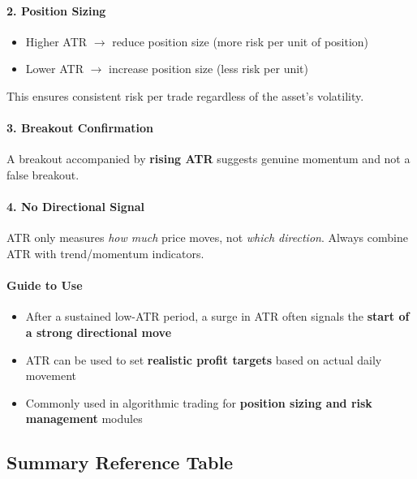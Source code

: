 \documentclass[12pt,openany]{book}
\begin{document}
\paragraph{2. Position Sizing}
\begin{itemize}[leftmargin=*]
    \item Higher ATR \(\rightarrow\) reduce position size (more risk per unit of position)
    \item Lower ATR \(\rightarrow\) increase position size (less risk per unit)
\end{itemize}

This ensures consistent risk per trade regardless of the asset's volatility.

\paragraph{3. Breakout Confirmation}
A breakout accompanied by \textbf{rising ATR} suggests genuine momentum and not a false breakout.

\paragraph{4. No Directional Signal}
ATR only measures \emph{how much} price moves, not \emph{which direction}. Always combine ATR with trend/momentum indicators.

\paragraph{Guide to Use}
\begin{itemize}[leftmargin=*]
    \item After a sustained low-ATR period, a surge in ATR often signals the \textbf{start of a strong directional move}
    \item ATR can be used to set \textbf{realistic profit targets} based on actual daily movement
    \item Commonly used in algorithmic trading for \textbf{position sizing and risk management} modules
\end{itemize}

\subsection{Summary Reference Table}
\end{document}
